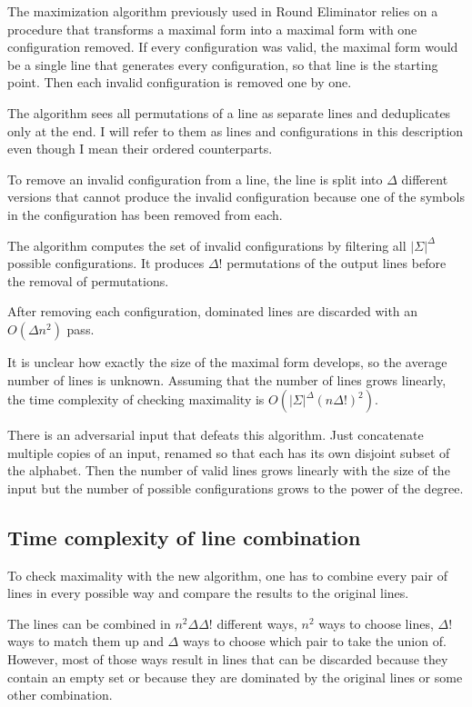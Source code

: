 \documentclass[english, 12pt, a4paper, sci, a-1b, online]{aaltothesis}
\begin{document}
The maximization algorithm previously used in Round Eliminator relies on a procedure that transforms a maximal form into a maximal form with one configuration removed. If every configuration was valid, the maximal form would be a single line that generates every configuration, so that line is the starting point. Then each invalid configuration is removed one by one.

The algorithm sees all permutations of a line as separate lines and deduplicates only at the end. I will refer to them as lines and configurations in this description even though I mean their ordered counterparts.

To remove an invalid configuration from a line, the line is split into $\Delta$ different versions that cannot produce the invalid configuration because one of the symbols in the configuration has been removed from each.

The algorithm computes the set of invalid configurations by filtering all $|\Sigma|^{\Delta}$ possible configurations. It produces $\Delta!$ permutations of the output lines before the removal of permutations.

After removing each configuration, dominated lines are discarded with an $O(\Delta n^2)$ pass.

It is unclear how exactly the size of the maximal form develops, so the average number of lines is unknown. Assuming that the number of lines grows linearly, the time complexity of checking maximality is $O(|\Sigma|^{\Delta}{(n\Delta!)}^2)$.

There is an adversarial input that defeats this algorithm. Just concatenate multiple copies of an input, renamed so that each has its own disjoint subset of the alphabet. Then the number of valid lines grows linearly with the size of the input but the number of possible configurations grows to the power of the degree.

\subsection{Time complexity of line combination}

To check maximality with the new algorithm, one has to combine every pair of lines in every possible way and compare the results to the original lines.

The lines can be combined in $n^2\Delta\Delta!$ different ways, $n^2$ ways to choose lines, $\Delta!$ ways to match them up and $\Delta$ ways to choose which pair to take the union of. However, most of those ways result in lines that can be discarded because they contain an empty set or because they are dominated by the original lines or some other combination.
\end{document}
